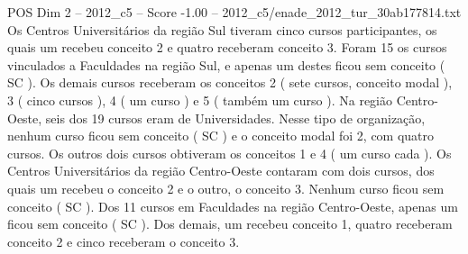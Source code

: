 \begin{textsample}{POS Dim 2 – 2012\_c5 – Score -1.00 – 2012\_c5/enade\_2012\_tur\_30ab177814.txt}
Os Centros Universitários da região Sul tiveram cinco cursos participantes, os quais um recebeu conceito 2 e quatro receberam conceito 3.
Foram 15 os cursos vinculados a Faculdades na região Sul, e apenas um destes ficou sem conceito ( SC ).
Os demais cursos receberam os conceitos 2 ( sete cursos, conceito modal ), 3 ( cinco cursos ), 4 ( um curso ) e 5 ( também um curso ).
Na região Centro-Oeste, seis dos 19 cursos eram de Universidades.
Nesse tipo de organização, nenhum curso ficou sem conceito ( SC ) e o conceito modal foi 2, com quatro cursos.
Os outros dois cursos obtiveram os conceitos 1 e 4 ( um curso cada ).
Os Centros Universitários da região Centro-Oeste contaram com dois cursos, dos quais um recebeu o conceito 2 e o outro, o conceito 3.
Nenhum curso ficou sem conceito ( SC ).
Dos 11 cursos em Faculdades na região Centro-Oeste, apenas um ficou sem conceito ( SC ).
Dos demais, um recebeu conceito 1, quatro receberam conceito 2 e cinco receberam o conceito 3.

\end{textsample}
